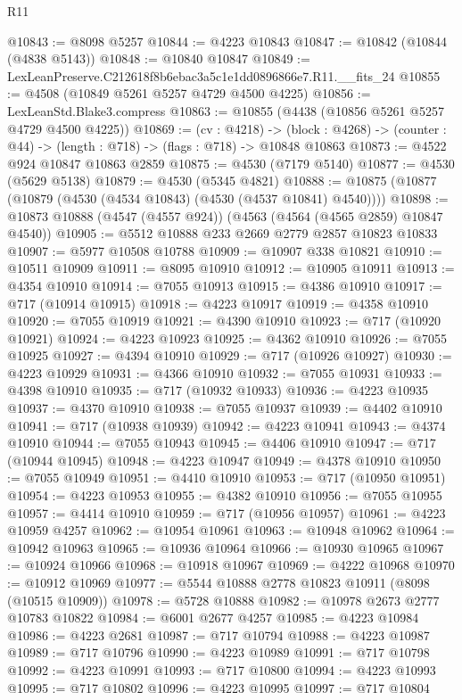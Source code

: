 \begin{lexlean}{R11}
\begin{coremodule}
@10843 := @8098 @5257
@10844 := @4223 @10843
@10847 := @10842 (@10844 (@4838 @5143))
@10848 := @10840 @10847
@10849 := LexLeanPreserve.C212618f8b6ebac3a5c1e1dd0896866e7.R11.__fits_24
@10855 := @4508 (@10849 @5261 @5257 @4729 @4500 @4225)
@10856 := LexLeanStd.Blake3.compress
@10863 := @10855 (@4438 (@10856 @5261 @5257 @4729 @4500 @4225))
@10869 := (cv : @4218) ->
  (block : @4268) -> (counter : @44) -> (length : @718) -> (flags : @718) -> @10848 @10863
@10873 := @4522 @924 @10847 @10863 @2859
@10875 := @4530 (@7179 @5140)
@10877 := @4530 (@5629 @5138)
@10879 := @4530 (@5345 @4821)
@10888 := @10875 (@10877 (@10879 (@4530 (@4534 @10843) (@4530 (@4537 @10841) @4540))))
@10898 := @10873 @10888 (@4547 (@4557 @924)) (@4563 (@4564 (@4565 @2859) @10847 @4540))
@10905 := @5512 @10888 @233 @2669 @2779 @2857 @10823 @10833
@10907 := @5977 @10508 @10788
@10909 := @10907 @338 @10821
@10910 := @10511 @10909
@10911 := @8095 @10910
@10912 := @10905 @10911
@10913 := @4354 @10910
@10914 := @7055 @10913
@10915 := @4386 @10910
@10917 := @717 (@10914 @10915)
@10918 := @4223 @10917
@10919 := @4358 @10910
@10920 := @7055 @10919
@10921 := @4390 @10910
@10923 := @717 (@10920 @10921)
@10924 := @4223 @10923
@10925 := @4362 @10910
@10926 := @7055 @10925
@10927 := @4394 @10910
@10929 := @717 (@10926 @10927)
@10930 := @4223 @10929
@10931 := @4366 @10910
@10932 := @7055 @10931
@10933 := @4398 @10910
@10935 := @717 (@10932 @10933)
@10936 := @4223 @10935
@10937 := @4370 @10910
@10938 := @7055 @10937
@10939 := @4402 @10910
@10941 := @717 (@10938 @10939)
@10942 := @4223 @10941
@10943 := @4374 @10910
@10944 := @7055 @10943
@10945 := @4406 @10910
@10947 := @717 (@10944 @10945)
@10948 := @4223 @10947
@10949 := @4378 @10910
@10950 := @7055 @10949
@10951 := @4410 @10910
@10953 := @717 (@10950 @10951)
@10954 := @4223 @10953
@10955 := @4382 @10910
@10956 := @7055 @10955
@10957 := @4414 @10910
@10959 := @717 (@10956 @10957)
@10961 := @4223 @10959 @4257
@10962 := @10954 @10961
@10963 := @10948 @10962
@10964 := @10942 @10963
@10965 := @10936 @10964
@10966 := @10930 @10965
@10967 := @10924 @10966
@10968 := @10918 @10967
@10969 := @4222 @10968
@10970 := @10912 @10969
@10977 := @5544 @10888 @2778 @10823 @10911 (@8098 (@10515 @10909))
@10978 := @5728 @10888
@10982 := @10978 @2673 @2777 @10783 @10822
@10984 := @6001 @2677 @4257
@10985 := @4223 @10984
@10986 := @4223 @2681
@10987 := @717 @10794
@10988 := @4223 @10987
@10989 := @717 @10796
@10990 := @4223 @10989
@10991 := @717 @10798
@10992 := @4223 @10991
@10993 := @717 @10800
@10994 := @4223 @10993
@10995 := @717 @10802
@10996 := @4223 @10995
@10997 := @717 @10804

\end{coremodule}
\end{lexlean}
